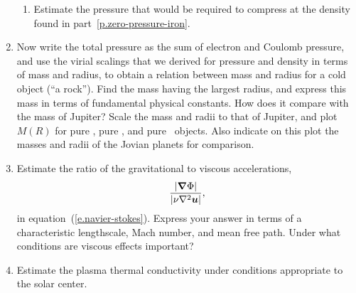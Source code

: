 \begin{enumerate}
\begin{enumerate}
\item Estimate the pressure that would be required to compress \iron[56] at the density found in part~\ref{p.zero-pressure-iron}.
\end{enumerate}

\item Now write the total pressure as the sum of electron and Coulomb pressure, and use the virial scalings that we derived for pressure and density in terms of mass and radius, to obtain a relation between mass and radius for a cold object (``a rock'').  Find the mass having the largest radius, and express this mass in terms of fundamental physical constants.  How does it compare with the mass of Jupiter?  Scale the mass and radii to that of Jupiter, and plot $M(R)$ for pure \hydrogen, pure \helium, and pure \carbon\ objects.  Also indicate on this plot the masses and radii of the Jovian planets for comparison.

\item Estimate the ratio of the gravitational to viscous accelerations,
\[ \frac{|\boldsymbol{\nabla}\Phi|}{|\nu\nabla^{2}\boldsymbol{u}|} ,\]
in equation~(\ref{e.navier-stokes}).  Express your answer in terms of a characteristic lengthscale, Mach number, and mean free path.  Under what conditions are viscous effects important?

\item Estimate the plasma thermal conductivity under conditions appropriate to the solar center.

\end{enumerate}
